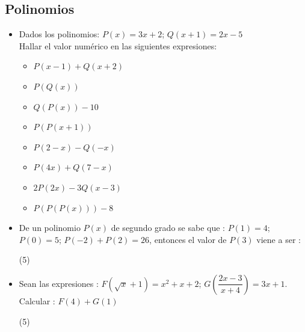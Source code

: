 \documentclass[11pt, twocolumn, landscape, a4paper]{article}
\begin{document}
\subsection*{Polinomios}

\begin{itemize}
\item{Dados los polinomios: \quad$P(x) = 3x + 2$; \quad$Q(x + 1) = 2x - 5$\\ Hallar el valor numérico en las siguientes expresiones:
\begin{itemize}[label=$\circ\;$]
\item{$P(x - 1) + Q(x + 2)$}
\item{$P(Q(x))$}
\item{$Q(P(x)) - 10$}
\item{$P(P(x + 1))$}
\item{$P(2 - x) - Q(-x)$}
\item{$P(4x) + Q(7 - x)$}
\item{$2P(2x) - 3Q(x - 3)$}
\item{$P(P(P(x))) - 8$}
\end{itemize}
}
\item{De un polinomio $P(x)$ de segundo grado se sabe que : $P(1) = 4$; $P(0) = 5$; $P(-2) + P(2) = 26$, entonces el valor de $P(3)$ viene a ser :
\begin{tasks}(5)
\end{tasks}
}
\item{Sean las expresiones : \quad$F(\sqrt{x} + 1) = x^{2} + x + 2$; \quad$G(\dfrac{2x - 3}{x + 4}) = 3x + 1$. \\ Calcular : $F(4) + G(1)$
\begin{tasks}(5)
\end{tasks}
}
\end{itemize}
\end{document}
